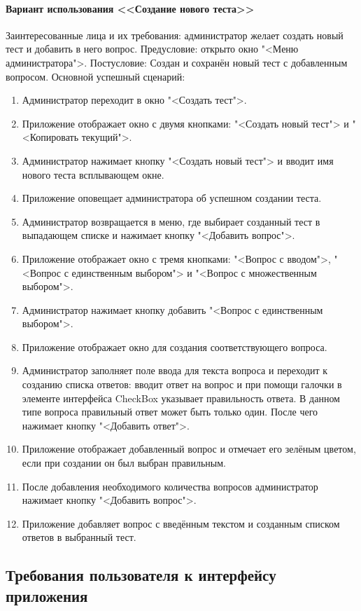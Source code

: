 \paragraph{Вариант использования <<Создание нового теста>>}

Заинтересованные лица и их требования: администратор желает создать новый тест и добавить в него вопрос.
Предусловие: открыто окно "<Меню администратора">.
Постусловие: Создан и сохранён новый тест с добавленным вопросом.
Основной успешный сценарий:
\begin{enumerate}
	\item Администратор переходит в окно "<Создать тест">.
	\item Приложение отображает окно с двумя кнопками: "<Создать новый тест"> и "<Копировать текущий">.
	\item Администратор нажимает кнопку "<Создать новый тест"> и вводит имя нового теста всплывающем окне.
	\item Приложение оповещает администратора об успешном создании теста. 
	\item Администратор возвращается в меню, где выбирает созданный тест в выпадающем списке и нажимает кнопку "<Добавить вопрос">.
	\item Приложение отображает окно с тремя кнопками: "<Вопрос с вводом">, "<Вопрос с единственным выбором"> и "<Вопрос с множественным выбором">.
	\item Администратор нажимает кнопку добавить "<Вопрос с единственным выбором">.
	\item Приложение отображает окно для создания соответствующего вопроса.
	\item Администратор заполняет поле ввода для текста вопроса и переходит к созданию списка ответов: вводит ответ на вопрос и при помощи галочки в элементе интерфейса CheckBox указывает правильность ответа. В данном типе вопроса правильный ответ может быть только один. После чего нажимает кнопку "<Добавить ответ">.
	\item Приложение отображает добавленный вопрос и отмечает его зелёным цветом, если при создании он был выбран правильным.
	\item После добавления необходимого количества вопросов администратор нажимает кнопку "<Добавить вопрос">.
	\item Приложение добавляет вопрос с введённым текстом и созданным списком ответов в выбранный тест.
\end{enumerate}

\subsection{Требования пользователя к интерфейсу приложения}

